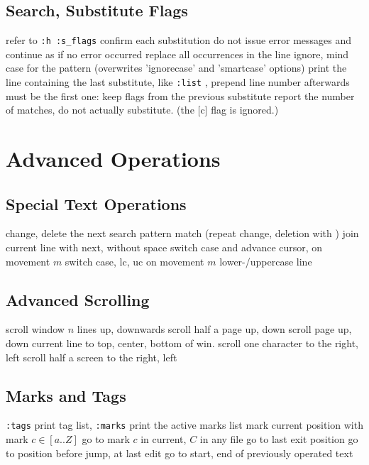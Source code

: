 \subsection{Search, Substitute Flags}	{refer to {\tt :h :s\_flags}}
	{confirm each substitution}
	{do not issue error messages and continue as if no error occurred}
	{replace all occurrences in the line}
	{ignore, mind case for the pattern (overwrites 'ignorecase' and 'smartcase' options)}
	{print the line containing the last substitute, like {\tt :list} , prepend line number afterwards}
\cmdOper{\&}	{must be the first one: keep flags from the previous substitute}
	{report the number of matches, do not actually substitute.  (the [c] flag is ignored.) }

\section{Advanced Operations}{}
\subsection{Special Text Operations}{}
	{change, delete the next search pattern match (repeat change, deletion with )}
	{join current line with next, without space}
	{switch case and advance cursor, on movement $m$ }
	{switch case, lc, uc on movement $m$}
	{lower-/uppercase line}

\subsection{Advanced Scrolling}	{}
	{scroll window $n$ lines up, downwards}
	{scroll half a page up, down}
	{scroll page up, down}
	{current line to top, center, bottom of win.}
	{scroll one character to the right, left}
	{scroll half a screen to the right, left}

\subsection{Marks and Tags}	{{\tt :tags} print tag list, {\tt :marks} print the active marks list}
	{mark current position with mark $c\in[a..Z]$}
	{go to mark $c$ in current, $C$ in any file}
	{go to last exit position}
	{go to position before jump, at last edit}
	{go to start, end of previously operated text}

